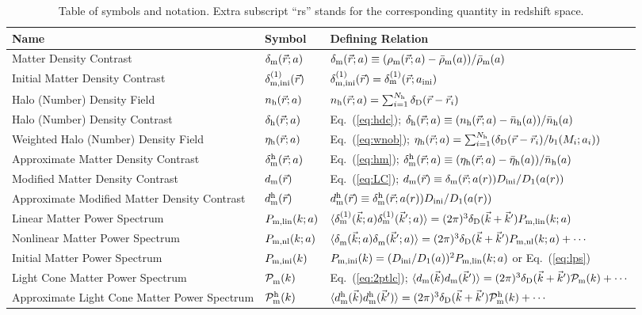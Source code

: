 \documentclass[prd,amsmath,amssymb,floatfix,superscriptaddress,nofootinbib,twocolumn]{revtex4-1}
\newcommand{\ini}{\rm ini}
\newcommand{\vrr}{\vec{r}}
\newcommand{\vk}{\vec{k}}
\newcommand{\ec}[1]{Eq.~(\ref{eq:#1})}
\newcommand\dmh{\delta_{\rm m}^{\rm h}}
\begin{document}
\begin{table}[h!]\label{tb}
\centering
\begin{tabular}{ |p{7.5cm}||p{2 cm}|p{7.5cm}|  }
 \hline
Name & Symbol &Defining Relation\\
 \hline
 \hline
 Matter Density Contrast   & $\delta_{\rm m}(\vrr;a)$    & $\delta_{\rm m}(\vrr;a)\equiv (\rho_{\rm m}(\vrr;a)-\bar{\rho}_{\rm m}(a))/{\bar{\rho}_{\rm m}(a)}$\\
 Initial Matter Density Contrast   & $\delta^{(1)}_{\rm m,ini}(\vrr)$    & $\delta^{(1)}_{\rm m,ini}(\vrr)= \delta^{(1)}_{\rm m}(\vrr;a_{\ini})$\\
  Halo (Number) Density Field & $n_{\rm h}(\vrr;a)$ & $n_{\rm h}(\vrr;a)=\sum_{i=1}^{N_{\rm h}}\delta_{\rm D}(\vrr-\vrr_{i})$\\
 Halo (Number) Density Contrast &   $\delta_{\rm h}(\vrr;a)$  &  \ec{hdc}; $\delta_{\rm h}(\vrr;a)\equiv (n_{\rm h}(\vrr;a)-\bar{n}_{\rm h}(a))/{\bar{n}_{\rm h}(a)}$ \\
 Weighted Halo (Number) Density Field & $\eta_{\rm h}(\vrr;a)$ & \ec{wnob}; $\eta_{\rm h}(\vrr;a)=\sum_{i=1}^{N_{\rm h}}(\delta_{\rm D}(\vrr-\vrr_{i})/b_{1}(M_{i};a_{i}))$\\
 Approximate Matter Density Contrast    & $\delta_{\rm m}^{\rm h}(\vrr;a)$ & \ec{hm}; $\dmh(\vrr;a) \equiv {(\eta_{\rm h}(\vrr;a)-\bar{\eta}_{\rm h}(a))}/{\bar{n}_{\rm h}(a)}$\\
  \hline
 Modified Matter Density Contrast &   $d_{\rm m}(\vrr)$ & \ec{LC}; $d_{\rm m}(\vrr) \equiv \delta_{\rm m}(\vrr;a(r)) {D_{\ini}}/{D_{1}(a(r))} $\\
 Approximate Modified Matter Density Contrast& $d_{\rm m}^{\rm h}(\vrr)$  & $d_{\rm m}^{\rm h}(\vrr) \equiv \delta_{\rm m}^{\rm h}(\vrr;a(r)) {D_{\ini}}/{D_{1}(a(r))} $  \\
 \hline
 Linear Matter Power Spectrum &$P_{\rm m,lin}(k;a)$ & $\langle \delta^{(\rm 1)}_{\rm m}(\vk;a) \delta^{(\rm 1)}_{\rm m}(\vk';a) \rangle = (2\pi)^3 \delta_{\rm D}(\vk+\vk')P_{\rm m,lin}(k;a)$\\
 Nonlinear Matter Power Spectrum &$P_{\rm m,nl}(k;a)$ & $\langle \delta^{}_{\rm m}(\vk;a) \delta^{}_{\rm m}(\vk';a) \rangle = (2\pi)^3 \delta_{\rm D}(\vk+\vk')P_{\rm m,nl}(k;a)+\cdots$\\
 Initial Matter Power Spectrum & $ P_{\rm m,ini}(k)$ & $P_{\rm m,ini}(k)=(D_{\ini}/D_{1}(a))^2P_{\rm m,lin}(k;a)$ or \ec{lps} \\
 Light Cone Matter Power Spectrum & $\mathcal{P}_{\rm m}^{}(k)$ & \ec{2ptlc}; $\langle d_{\rm m} (\vk)d_{\rm m}(\vk')\rangle =(2\pi)^3 \delta_{\rm D}(\vk+\vk')\mathcal{P}_{\rm m}(k)+\cdots$\\
 Approximate Light Cone Matter Power Spectrum & $\mathcal{P}_{\rm m}^{\rm h}(k)$ &  $\langle d_{\rm m}^{\rm h} (\vk)d_{\rm m}^{\rm h}(\vk')\rangle = (2\pi)^3 \delta_{\rm D}(\vk+\vk')\mathcal{P}_{\rm m}^{\rm h}(k)+\cdots$\\
 \hline
\end{tabular}
\caption{Table of symbols and notation. Extra subscript ``rs'' stands for the corresponding quantity in redshift space.}
\label{table:1}
\end{table}
\end{document}
